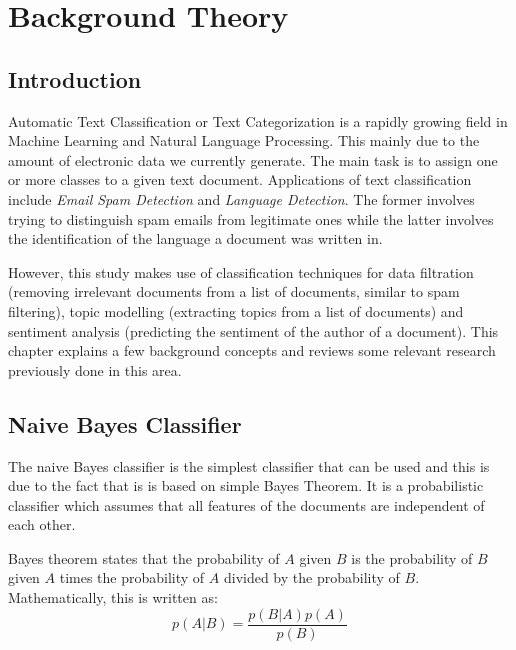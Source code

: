 
\chapter{Background Theory}

\label{ch:background}

\section{Introduction}
\label{sec:background_introduction}

Automatic Text Classification or Text Categorization is a rapidly growing field in Machine Learning
and Natural Language Processing. This mainly due to the amount of electronic data we currently
generate. The main task is to assign one or more classes to a given text document. Applications of
text classification include \textit{Email Spam Detection} and \textit{Language
Detection}. The former involves trying to distinguish spam emails from legitimate ones while the
latter involves the identification of the language a document was written in.

However, this study makes use of classification techniques for data filtration (removing irrelevant
documents from a list of documents, similar to spam filtering), topic modelling (extracting topics
from a list of documents) and sentiment analysis (predicting the sentiment of the author of a
document). This chapter explains a few background concepts and reviews some relevant research
previously done in this area.

\section{Naive Bayes Classifier}
\label{sec:bg_text_classification}
The naive Bayes classifier is the simplest classifier that can be used and this is due to the fact
that is is based on simple Bayes Theorem. It is a probabilistic classifier which
assumes that all features of the documents are independent of each other.

Bayes theorem states that the probability of $A$ given $B$ is the probability of $B$ given $A$ times
the probability of $A$ divided by the probability of $B$. Mathematically, this is written as:
\begin{equation}
  p(A|B) = \frac{p(B|A)p(A)}{p(B)}
\end{equation}

